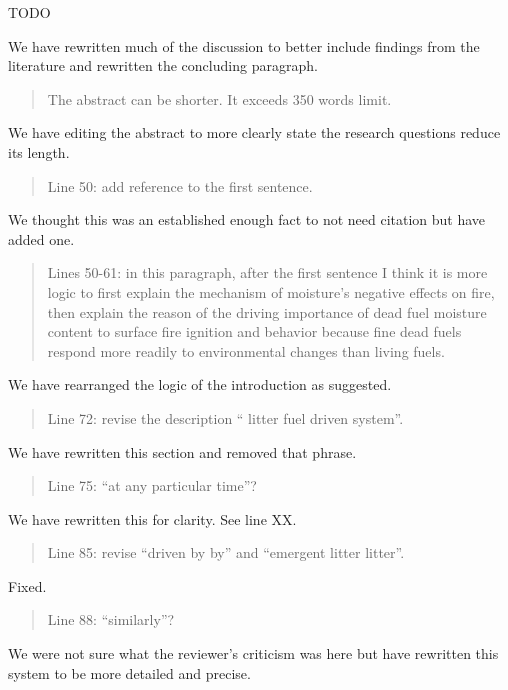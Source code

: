 \documentclass[letterpaper, 12pt]{letter}
\begin{document}
\begin{letter}{}
TODO

We have rewritten much of the discussion to better include findings from the literature and rewritten the concluding paragraph. 

\begin{quote}
The abstract can be shorter. It exceeds 350 words limit. 
\end{quote}

We have editing the abstract to more clearly state the research questions reduce its length.

\begin{quote}
Line 50: add reference to the first sentence.
\end{quote}

We thought this was an established enough fact to not need citation but have added one.

\begin{quote}
Lines 50-61: in this paragraph, after the first sentence I think it is more logic to first explain the mechanism of moisture’s negative effects on fire, then explain the reason of the driving importance of dead fuel moisture content to surface fire ignition and behavior because fine dead fuels respond more readily to environmental changes than living fuels.
\end{quote}

We have rearranged the logic of the introduction as suggested.

\begin{quote}
Line 72: revise the description “ litter fuel driven system”.
\end{quote}

We have rewritten this section and removed that phrase.

\begin{quote}
Line 75: “at any particular time”?
\end{quote}

We have rewritten this for clarity. See line XX.

\begin{quote}
Line 85: revise “driven by by” and “emergent litter litter”.
\end{quote}

Fixed.

\begin{quote}
Line 88: “similarly”?
\end{quote}

We were not sure what the reviewer's criticism was here but have rewritten this system to be more detailed and precise.


\end{letter}
\end{document}
